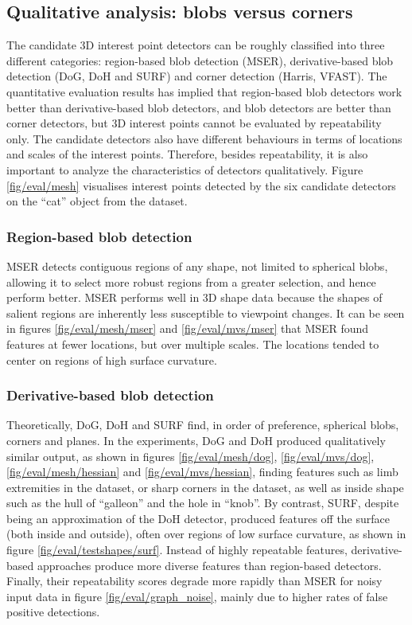 \subsection{Qualitative analysis: blobs versus corners}
The candidate 3D interest point detectors can be roughly classified into three different categories: region-based blob detection (MSER), derivative-based blob detection (DoG, DoH and SURF) and corner detection (Harris, VFAST). The quantitative evaluation results has implied that region-based blob detectors work better than derivative-based blob detectors, and blob detectors are better than corner detectors, but 3D interest points cannot be evaluated by repeatability only. The candidate detectors also have different behaviours in terms of locations and scales of the interest points. Therefore, besides repeatability, it is also important to analyze the characteristics of detectors qualitatively. Figure \ref{fig/eval/mesh} visualises interest points detected by the six candidate detectors on the ``cat'' object from the \meshset dataset.

\subsubsection{Region-based blob detection} MSER detects contiguous regions of any shape, \ie not limited to spherical blobs, allowing it to select more robust regions from a greater selection, and hence perform better. MSER performs well in 3D shape data because the shapes of salient regions are inherently less susceptible to viewpoint changes. It can be seen in figures \ref{fig/eval/mesh/mser} and \ref{fig/eval/mvs/mser} that MSER found features at fewer locations, but over multiple scales. The locations tended to center on regions of high surface curvature.

\subsubsection{Derivative-based blob detection} Theoretically, DoG, DoH and SURF find, in order of preference, spherical blobs, corners and planes. In the experiments, DoG and DoH produced qualitatively similar output, as shown in figures \ref{fig/eval/mesh/dog}, \ref{fig/eval/mvs/dog}, \ref{fig/eval/mesh/hessian} and \ref{fig/eval/mvs/hessian}, finding features such as limb extremities in the \meshset dataset, or sharp corners in the \stereoset dataset, as well as inside shape such as the hull of ``galleon'' and the hole in ``knob''. By contrast, SURF, despite being an approximation of the DoH detector, produced features off the surface (both inside and outside), often over regions of low surface curvature, as shown in figure \ref{fig/eval/testshapes/surf}. Instead of highly repeatable features, derivative-based approaches produce more diverse features than region-based detectors. Finally, their repeatability scores degrade more rapidly than MSER for noisy input data in figure \ref{fig/eval/graph_noise}, mainly due to higher rates of false positive detections. 


